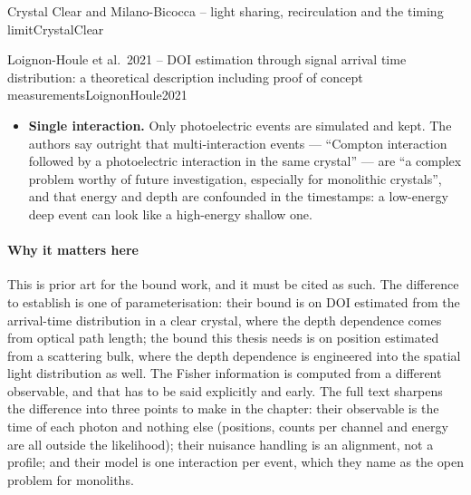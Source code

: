 \begin{programnote}{Crystal Clear and Milano-Bicocca -- light sharing, recirculation and the timing limit}{CrystalClear}
\begin{papernote}{Loignon-Houle et al.\ 2021 -- DOI estimation through signal arrival time distribution: a theoretical description including proof of concept measurements}{LoignonHoule2021}
\begin{itemize}
		the bound's come from the analytic model of \ref{note:Cates2015}.
	\item \textbf{Single interaction.} Only photoelectric events are
		simulated and kept. The authors say outright that multi-interaction
		events --- ``Compton interaction followed by a photoelectric
		interaction in the same crystal'' --- are ``a complex problem worthy of
		future investigation, especially for monolithic crystals'', and that
		energy and depth are confounded in the timestamps: a low-energy deep
		event can look like a high-energy shallow one.
\end{itemize}

\paragraph{Why it matters here}
This is prior art for the bound work, and it must be cited as such. The
difference to establish is one of parameterisation: their bound is on DOI
estimated from the arrival-time distribution in a clear crystal, where the
depth dependence comes from optical path length; the bound this thesis needs is
on position estimated from a scattering bulk, where the depth dependence is
engineered into the spatial light distribution as well. The Fisher information
is computed from a different observable, and that has to be said explicitly and
early.
The full text sharpens the difference into three points to make in the
chapter: their observable is the time of each photon and nothing else
(positions, counts per channel and energy are all outside the likelihood);
their nuisance handling is an alignment, not a profile; and their model is one
interaction per event, which they name as the open problem for monoliths.

\end{papernote}

\end{programnote}

